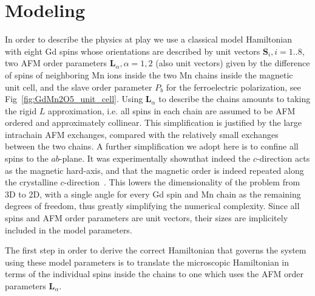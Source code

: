 \section{Modeling}
In order to describe the physics at play we use a classical model Hamiltonian with eight Gd spins whose orientations are described by unit vectors $\mathbf{S}_i, i=1..8$, two AFM order parameters $\mathbf{L}_\alpha, \alpha=1,2$ (also unit vectors) given by the difference of spins of neighboring Mn ions inside the two Mn chains inside the magnetic unit cell, and the slave order parameter $P_b$ for the ferroelectric polarization, see Fig~\ref{fig:GdMn2O5_unit_cell}.
Using $\mathbf{L}_\alpha$ to describe the chains amounts to taking the rigid $L$ approximation, i.e. all spins in each chain are assumed to be AFM ordered and approximately collinear. This simplification is justified by the large intrachain AFM exchanges, compared with the relatively small exchanges between the two chains.
A further simplification we adopt here is to confine all spins to the $ab$-plane. It was experimentally shownthat indeed the $c$-direction acts as the magnetic hard-axis, and that the magnetic order is indeed repeated along the crystalline $c$-direction~\cite{Lee13}.
This lowers the dimensionality of the problem from 3D to 2D, with a single angle for every Gd spin and Mn chain as the remaining degrees of freedom, thus greatly simplifying the numerical complexity.
Since all spins and AFM order parameters are unit vectors, their sizes are implicitely included in the model parameters.

The first step in order to derive the correct Hamiltonian that governs the system using these model parameters is to translate the microscopic Hamiltonian in terms of the individual spins inside the chains to one which uses the AFM order parameters $\mathbf{L}_\alpha$.

